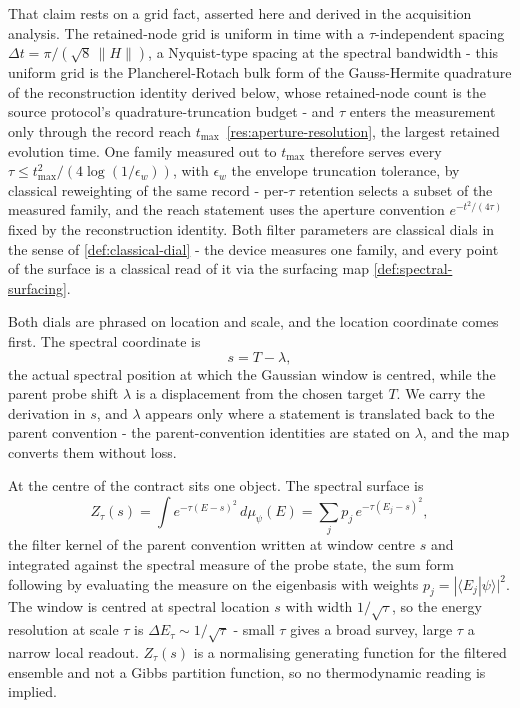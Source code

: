 That claim rests on a grid fact, asserted here and derived in the acquisition analysis. The retained-node grid is uniform in time with a $\tau$-independent spacing $\Delta t=\pi/(\sqrt{8}\,\|H\|)$, a Nyquist-type spacing at the spectral bandwidth - this uniform grid is the Plancherel-Rotach bulk form of the Gauss-Hermite quadrature of the reconstruction identity derived below, whose retained-node count is the source protocol's quadrature-truncation budget \cite{mccaul2025snacks,leamer2024emulation} - and $\tau$ enters the measurement only through the record reach $t_{\max}$~\eqref{res:aperture-resolution}, the largest retained evolution time. One family measured out to $t_{\max}$ therefore serves every $\tau\le t_{\max}^{2}/(4\log(1/\epsilon_w))$, with $\epsilon_w$ the envelope truncation tolerance, by classical reweighting of the same record - per-$\tau$ retention selects a subset of the measured family, and the reach statement uses the aperture convention $e^{-t^{2}/(4\tau)}$ fixed by the reconstruction identity. Both filter parameters are classical dials in the sense of \eqref{def:classical-dial} - the device measures one family, and every point of the surface is a classical read of it via the surfacing map \eqref{def:spectral-surfacing}.

Both dials are phrased on location and scale, and the location coordinate comes first. The spectral coordinate is
\begin{equation}\label{def:spectral-coordinate-s}
s = T - \lambda,
\end{equation}
the actual spectral position at which the Gaussian window is centred, while the parent probe shift $\lambda$ is a displacement from the chosen target $T$. We carry the derivation in $s$, and $\lambda$ appears only where a statement is translated back to the parent convention - the parent-convention identities are stated on $\lambda$, and the map converts them without loss.

At the centre of the contract sits one object. The spectral surface is
\begin{equation}\label{def:spectral-surface}
Z_\tau(s)=\int e^{-\tau(E-s)^{2}}\,d\mu_\psi(E)=\sum_j p_j\,e^{-\tau(E_j-s)^{2}},
\end{equation}
the filter kernel of the parent convention written at window centre $s$ and integrated against the spectral measure of the probe state, the sum form following by evaluating the measure on the eigenbasis with weights $p_j=|\langle E_j|\psi\rangle|^{2}$. The window is centred at spectral location $s$ with width $1/\sqrt{\tau}$, so the energy resolution at scale $\tau$ is $\Delta E_\tau\sim 1/\sqrt{\tau}$ - small $\tau$ gives a broad survey, large $\tau$ a narrow local readout. $Z_\tau(s)$ is a normalising generating function for the filtered ensemble and not a Gibbs partition function, so no thermodynamic reading is implied.

